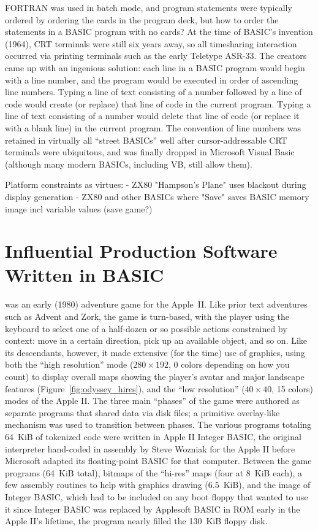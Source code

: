 \documentclass{article}
\begin{document}
FORTRAN was used in batch mode, and program statements were typically
ordered by ordering the cards in the program deck, but how to order the
statements in a BASIC program with no cards?
At the time of BASIC's invention (1964), CRT terminals were still six
years away, so all timesharing interaction occurred via printing
terminals such as the early Teletype ASR-33.
The creators came up with an ingenious solution: each line in a BASIC
program would begin with a line number, and the program would be
executed in order of ascending line numbers.
Typing a line of text consisting of a number followed by a line of code
would create (or replace) that line of code in the current program.
Typing a line of text consisting of a number would delete that line of
code (or replace it with a blank line) in the current program.
The convention of line numbers was retained in virtually all ``street
BASICs'' well after cursor-addressable CRT terminals were ubiquitous,
and was finally dropped in Microsoft Visual Basic (although many modern
BASICs, including VB, still allow them).

Platform constraints as virtues:
 - ZX80 "Hampson's Plane" uses blackout during display generation 
 - ZX80 and other BASICs where "Save" saves BASIC memory image incl
 variable values (save game?)

\section{Influential Production Software Written in BASIC}

 was an early (1980) adventure game
for the Apple~II.
Like prior text adventures such as Advent and Zork, the game is
turn-based, with the player using the 
keyboard to select one of a half-dozen or so possible actions
constrained by context: move in a certain direction, pick up an
available object, and so on.
Like its descendants, however, it made extensive (for the time) use of
graphics, using both the ``high resolution'' mode ($280\times 192$, 0 colors
depending on how you count) to display overall maps showing the player's
avatar and major landscape features (Figure~\ref{fig:odyssey_hires}), and the
``low resolution'' ($40\times 40$, 15
colors) modes of the Apple II.
The three main ``phases'' of the game were authored as separate programs
that shared data via disk files; a primitive overlay-like mechanism was
used to transition between phases.  
The various programs totaling 64~KiB of tokenized code were written in Apple II Integer
BASIC, the
original interpreter hand-coded in assembly by Steve Wozniak for
the Apple II before Microsoft adapted its floating-point BASIC for that
computer.  Between the game programs (64~KiB total), bitmaps of the ``hi-res''
maps (four at 8~KiB each), a few assembly routines to help with graphics
drawing (6.5~KiB), and the image of Integer BASIC, which had to be
included on any boot floppy that wanted to use it since Integer BASIC
was replaced by Applesoft BASIC in ROM early in the Apple II's lifetime,
the program nearly filled the 130~KiB floppy disk.
\end{document}
